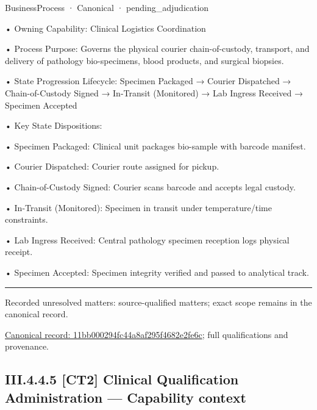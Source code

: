 \label{element:11bb000294fc44a8af295f4682e2fe6c}
{\small BusinessProcess · Canonical · pending\_adjudication}\par

•
Owning Capability: Clinical Logistics Coordination



•
Process Purpose: Governs the physical courier chain-of-custody, transport, and delivery of pathology bio-specimens, blood products, and surgical biopsies.



•
State Progression Lifecycle: Specimen Packaged → Courier Dispatched → Chain-of-Custody Signed → In-Transit (Monitored) → Lab Ingress Received → Specimen Accepted



•
Key State Dispositions:



•
Specimen Packaged: Clinical unit packages bio-sample with barcode manifest.



•
Courier Dispatched: Courier route assigned for pickup.



•
Chain-of-Custody Signed: Courier scans barcode and accepts legal custody.



•
In-Transit (Monitored): Specimen in transit under temperature/time constraints.



•
Lab Ingress Received: Central pathology specimen reception logs physical receipt.



•
Specimen Accepted: Specimen integrity verified and passed to analytical track.



\medskip\hrule\medskip

{\small Recorded unresolved matters: source-qualified matters; exact scope remains in the canonical record.}\par
{\footnotesize \href{../../../../../../../continuum/business/business-process/11bb000294fc44a8af295f4682e2fe6c.md}{Canonical record: 11bb000294fc44a8af295f4682e2fe6c}; full qualifications and provenance.}\par
\subsection*{III.4.4.5 [CT2] Clinical Qualification Administration — Capability context}
\label{navigation:III.4.4.5}

